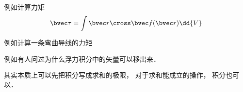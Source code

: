 
例如计算力矩
\begin{equation}
\bvec \tau = \int \bvec r \cross \bvec f(\bvec r) \dd{V}
\end{equation}

例如计算一条弯曲导线的力矩

例如有人问过为什么浮力积分中的矢量可以移出来．

其实本质上可以先把积分写成求和的极限， 对于求和能成立的操作， 积分也可以．
